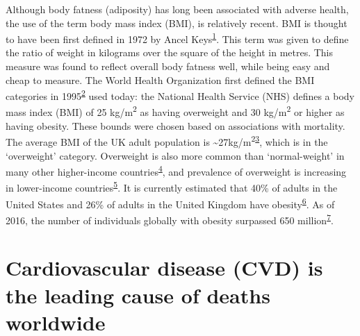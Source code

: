 \documentclass[11pt,twoside]{bristolthesis}
\begin{document}
Although body fatness (adiposity) has long been associated with adverse health, the use of the term body mass index (BMI), is relatively recent. BMI is thought to have been first defined in 1972 by Ancel Keys\textsuperscript{\protect\hyperlink{ref-Blackburn2014}{1}}. This term was given to define the ratio of weight in kilograms over the square of the height in metres. This measure was found to reflect overall body fatness well, while being easy and cheap to measure. The World Health Organization first defined the BMI categories in 1995\textsuperscript{\protect\hyperlink{ref-WHO1995}{2}} used today: the National Health Service (NHS) defines a body mass index (BMI) of 25 kg/m\textsuperscript{2} as having overweight and 30 kg/m\textsuperscript{2} or higher as having obesity. These bounds were chosen based on associations with mortality. The average BMI of the UK adult population is \textasciitilde27kg/m\textsuperscript{2}\textsuperscript{\protect\hyperlink{ref-Wade2018}{3}}, which is in the `overweight' category. Overweight is also more common than `normal-weight' in many other higher-income countries\textsuperscript{\protect\hyperlink{ref-NCD-RisC2016}{4}}, and prevalence of overweight is increasing in lower-income countries\textsuperscript{\protect\hyperlink{ref-Templin2019}{5}}. It is currently estimated that 40\% of adults in the United States and 26\% of adults in the United Kingdom have obesity\textsuperscript{\protect\hyperlink{ref-Bluher2019}{6}}. As of 2016, the number of individuals globally with obesity surpassed 650 million\textsuperscript{\protect\hyperlink{ref-TheLancetPublicHealth2018}{7}}.

\hypertarget{CVD-stats}{%
\section{Cardiovascular disease (CVD) is the leading cause of deaths worldwide}\label{CVD-stats}}
\end{document}
